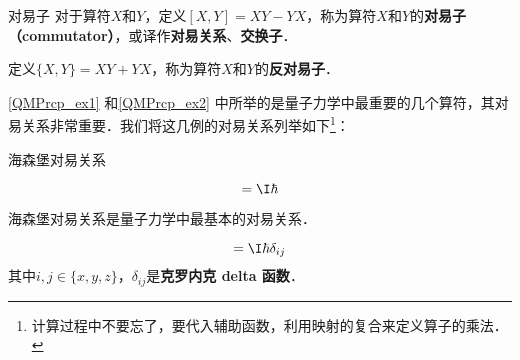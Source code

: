 \begin{definition}{对易子}\label{QMPrcp_def13}
对于算符$X$和$Y$，定义$[X, Y]=XY-YX$，称为算符$X$和$Y$的\textbf{对易子（commutator）}，或译作\textbf{对易关系}、\textbf{交换子}．

定义$\{X, Y\}=XY+YX$，称为算符$X$和$Y$的\textbf{反对易子}．
\end{definition}

\autoref{QMPrcp_ex1} 和\autoref{QMPrcp_ex2} 中所举的是量子力学中最重要的几个算符，其对易关系非常重要．我们将这几例的对易关系列举如下\footnote{计算过程中不要忘了，要代入辅助函数，利用映射的复合来定义算子的乘法．}：

\begin{theorem}{海森堡对易关系}\label{QMPrcp_the5}

\begin{equation}
[\hat{x}, \hat{p}_x] = \I\hbar
\end{equation}

\end{theorem}



海森堡对易关系是量子力学中最基本的对易关系．



\begin{corollary}{}\label{QMPrcp_cor1}

\begin{equation}
[\hat{i}, \hat{p}_j]=\I\hbar\delta_{ij}
\end{equation}
其中$i, j\in\{x, y, z\}$，$\delta_{ij}$是\textbf{克罗内克 delta 函数}．
\end{corollary}

